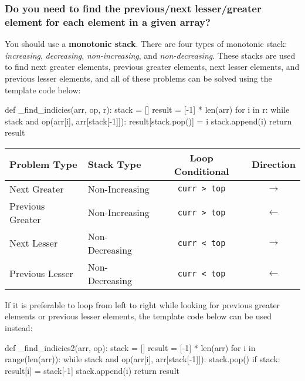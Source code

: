 \documentclass[12pt, titlepage]{article}
\begin{document}
\subsubsection{Do you need to find the previous/next lesser/greater element for each element in a given array?}

You should use a \textbf{monotonic stack}. There are four types of monotonic stack: \textit{increasing}, \textit{decreasing}, \textit{non-increasing}, and \textit{non-decreasing}. These stacks are used to find next greater elements, previous greater elements, next lesser elements, and previous lesser elements, and all of these problems can be solved using the template code below: \medskip

\begin{python}
def _find_indicies(arr, op, r):
    stack = []
    result = [-1] * len(arr)
    for i in r:
        while stack and op(arr[i], arr[stack[-1]]):
            result[stack.pop()] = i
        stack.append(i)
    return result
\end{python} \medskip

\begin{center}
\begin{tabular}{|l|l|c|c|}
  \hline
  Problem Type & Stack Type & Loop Conditional & Direction \\
  \hline
  Next Greater & Non-Increasing & \texttt{curr > top} & $\rightarrow$ \\
  Previous Greater & Non-Increasing & \texttt{curr > top} & $\leftarrow$ \\
  Next Lesser & Non-Decreasing & \texttt{curr < top} & $\rightarrow$ \\
  Previous Lesser & Non-Decreasing & \texttt{curr < top} & $\leftarrow$ \\
  \hline
\end{tabular}
\end{center} \bigskip

If it is preferable to loop from left to right while looking for previous greater elements or previous lesser elements, the template code below can be used instead: \medskip

\begin{python}
def _find_indicies2(arr, op):
    stack = []
    result = [-1] * len(arr)
    for i in range(len(arr)):
        while stack and op(arr[i], arr[stack[-1]]):
            stack.pop()
        if stack:
            result[i] = stack[-1]
        stack.append(i)
    return result
\end{python} \medskip
\end{document}
